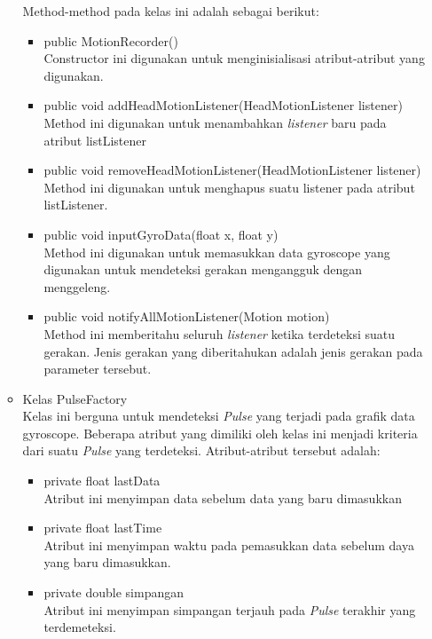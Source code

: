 \begin{itemize}
\begin{itemize}
\begin{itemize}
        \end{itemize}
        Method-method pada kelas ini adalah sebagai berikut:
        \begin{itemize}
            \item public MotionRecorder() \\
            Constructor ini digunakan untuk menginisialisasi atribut-atribut yang digunakan.
            \item public void addHeadMotionListener(HeadMotionListener listener)\\
            Method ini digunakan untuk menambahkan \textit{listener} baru pada atribut listListener
            \item public void removeHeadMotionListener(HeadMotionListener listener)\\
            Method ini digunakan untuk menghapus suatu listener pada atribut listListener.
            \item public void inputGyroData(float x, float y) \\
            Method ini digunakan untuk memasukkan data gyroscope yang digunakan untuk mendeteksi gerakan mengangguk dengan menggeleng.
            \item public void notifyAllMotionListener(Motion motion) \\ 
            Method ini memberitahu seluruh \textit{listener} ketika terdeteksi suatu gerakan. Jenis gerakan yang diberitahukan adalah jenis gerakan pada parameter tersebut.
        \end{itemize}
        \item Kelas PulseFactory\\
        Kelas ini berguna untuk mendeteksi \textit{Pulse} yang terjadi pada grafik data gyroscope. Beberapa atribut yang dimiliki oleh kelas ini menjadi kriteria dari suatu \textit{Pulse} yang terdeteksi.
        Atribut-atribut tersebut adalah:
        \begin{itemize}
            \item private float lastData\\
            Atribut ini menyimpan data sebelum data yang baru dimasukkan
            \item private float lastTime\\
            Atribut ini menyimpan waktu pada pemasukkan data sebelum daya yang baru dimasukkan.
            \item private double simpangan\\
            Atribut ini menyimpan simpangan terjauh pada \textit{Pulse} terakhir yang terdemeteksi.

\end{itemize}
\end{itemize}
\end{itemize}
